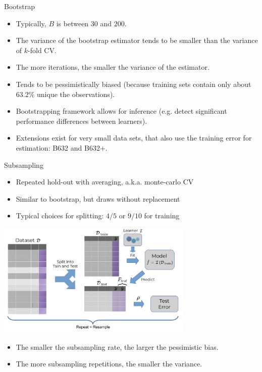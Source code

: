 \documentclass[11pt,compress,t,notes=noshow, xcolor=table]{beamer}
\begin{document}
\begin{vbframe}{Bootstrap}
\framebreak

\begin{itemize}
  \item Typically, $B$ is between $30$ and $200$.
  \item The variance of the bootstrap estimator tends to be smaller than the
  variance of $k$-fold CV.
  \item The more iterations, the smaller the variance of the estimator.
  \item Tends to be pessimistically biased
  (because training sets contain only about $63.2 \%$ unique the observations).
  \item Bootstrapping framework allows for inference 
  (e.g. detect significant performance differences between learners).
  \item Extensions exist for very small data sets, that also use the training error for  estimation: B632 and B632+.
\end{itemize}

\end{vbframe}


\begin{vbframe}{Subsampling}

\begin{itemize}
  \item Repeated hold-out with averaging, a.k.a. monte-carlo CV
  \item Similar to bootstrap, but draws without replacement
  \item Typical choices for splitting: $4/5$ or $9/10$ for training
\end{itemize}
\begin{center}
\includegraphics[width=0.7\textwidth]{figure_man/resampling_error.pdf}
\end{center}
\begin{itemize}
  \item The smaller the subsampling rate, the larger the pessimistic bias.
  \item The more subsampling repetitions, the smaller the variance.
\end{itemize}

\end{vbframe}
\end{document}
